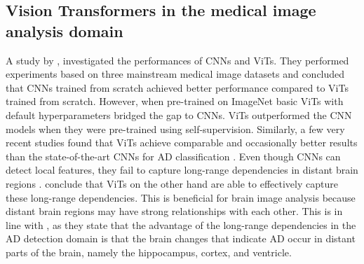 \documentclass[11pt, a4paper]{article}
\begin{document}
\subsection{Vision Transformers in the medical image analysis domain} \label{subs:ViTmedical}
A study by \cite{Matsoukas2021IsImages}, investigated the performances of CNNs and ViTs. They performed experiments based on three mainstream medical image datasets and concluded that CNNs trained from scratch achieved better performance compared to ViTs trained from scratch. However, when pre-trained on ImageNet basic ViTs with default hyperparameters bridged the gap to CNNs. ViTs outperformed the CNN models when they were pre-trained using self-supervision. Similarly, a few very recent studies found that ViTs achieve comparable and occasionally better results than the state-of-the-art CNNs for AD classification \citep{Lyu2022ClassificationTransformer, Sarraf2022OViTAD:Data}. Even though CNNs can detect local features, they fail to capture long-range dependencies in distant brain regions \citep{He2022TransformersReview}. \cite{Lyu2022ClassificationTransformer} conclude that ViTs on the other hand are able to effectively capture these long-range dependencies. This is beneficial for brain image analysis because distant brain regions may have strong relationships with each other. This is in line with \cite{Gunawardena2017ApplyingData}, as they state that the advantage of the long-range dependencies in the AD detection domain is that the brain changes that indicate AD occur in distant parts of the brain, namely the hippocampus, cortex, and ventricle. 
\end{document}
